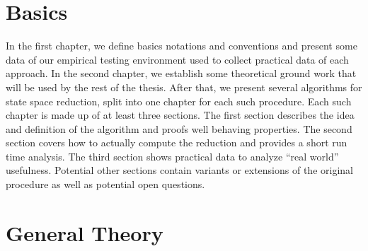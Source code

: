 \documentclass[oneside]{book}
\newcommand{\enquote}[1]{``#1''}
\theoremstyle{slplain}
\theoremstyle{definition}
\theoremstyle{remark}
\begin{document}
\tableofcontents




\chapter{Basics}
In the first chapter, we define basics notations and conventions and present some data of our empirical testing environment used to collect practical data of each approach.
In the second chapter, we establish some theoretical ground work that will be used by the rest of the thesis.
After that, we present several algorithms for state space reduction, split into one chapter for each such procedure. Each such chapter is made up of at least three sections. The first section describes the idea and definition of the algorithm and proofs well behaving properties. The second section covers how to actually compute the reduction and provides a short run time analysis. The third section shows practical data to analyze \enquote{real world} usefulness. Potential other sections contain variants or extensions of the original procedure as well as potential open questions.


\vspace{1cm}
 

\chapter{General Theory}


















\begin{appendices}

\end{appendices}





\end{document}

